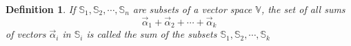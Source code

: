 \documentclass{article}
\newtheorem*{definition}{Definition}
\begin{document}
    \begin{definition}
        If \(\mathbb{S}_1, \mathbb{S}_2, \cdots, \mathbb{S}_n\) are subsets of a vector
        space \(\mathbb{V}\), the set of all sums
        \begin{equation*}
            \vec{\alpha}_1 + \vec{\alpha}_2 + \cdots + \vec{\alpha}_k
        \end{equation*}
        of vectors \(\vec{\alpha}_{i}\) in \(\mathbb{S}_i\) is called the sum of the subsets
        \(\mathbb{S}_1, \mathbb{S}_2, \cdots, \mathbb{S}_k\)
    \end{definition}
\end{document}

